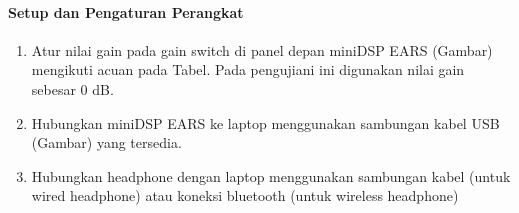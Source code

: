 \documentclass{article}
\begin{document}
	\paragraph{Setup dan Pengaturan Perangkat}
	\label{setup}
	\begin{enumerate}
		\item Atur nilai gain pada gain switch di panel depan miniDSP EARS (Gambar) mengikuti acuan pada Tabel. Pada pengujiani ini digunakan nilai gain sebesar 0 dB.
		
		
		\item Hubungkan miniDSP EARS ke laptop menggunakan sambungan kabel USB (Gambar) yang tersedia.
		
		\item Hubungkan headphone dengan laptop menggunakan sambungan kabel (untuk wired headphone) atau koneksi bluetooth (untuk wireless headphone)
		
	\end{enumerate}
	
\end{document}
